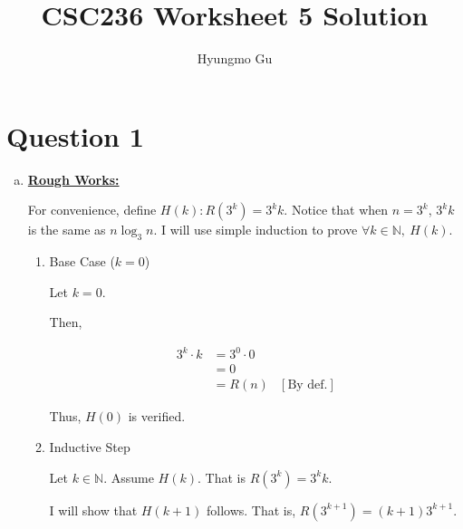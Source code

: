 \documentclass[12pt]{article}
\begin{document}
\title{CSC236 Worksheet 5 Solution}
\author{Hyungmo Gu}
\maketitle

\section*{Question 1}
\begin{enumerate}[a.]
    \item

    \bigskip

    \begin{mdframed}
        \underline{\textbf{Rough Works:}}

        \bigskip

        For convenience, define $H(k): R(3^k) = 3^kk$. Notice that when $n = 3^k$,
        $3^kk$ is the same as $n\log_3 n$. I will use simple induction to prove
        $\forall k \in \mathbb{N},\:H(k)$.

        \bigskip

        \begin{enumerate}[1.]
            \item Base Case ($k = 0$)

            \begin{mdframed}
            Let $k = 0$.

            \bigskip

            Then,

            \begin{align}
                3^k \cdot k &= 3^0 \cdot 0\\
                &= 0\\
                &= R(n) & [\text{By def.}]
            \end{align}

            Thus, $H(0)$ is verified.

            \end{mdframed}

            \item Inductive Step

            \begin{mdframed}
            Let $k \in \mathbb{N}$. Assume $H(k)$. That is $R(3^k) = 3^kk$.

            \bigskip

            I will show that $H(k+1)$ follows. That is, $R(3^{k+1}) = (k+1)3^{k+1}$.


\end{mdframed}
\end{enumerate}
\end{mdframed}
\end{enumerate}
\end{document}
